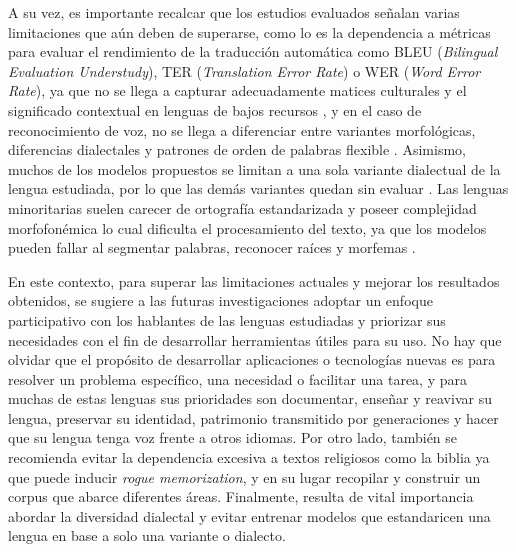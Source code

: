A su vez, es importante recalcar que los estudios evaluados señalan varias limitaciones que aún deben de superarse, como lo es la dependencia a métricas para evaluar el rendimiento de la traducción automática como BLEU (\textit{Bilingual Evaluation Understudy}), TER (\textit{Translation Error Rate}) o WER (\textit{Word Error Rate}), ya que no se llega a capturar adecuadamente matices culturales y el significado contextual en lenguas de bajos recursos \cite{Park2025}, y en el caso de reconocimiento de voz, no se llega a diferenciar entre variantes morfológicas, diferencias dialectales y patrones de orden de palabras flexible \cite{Akallouch2025}. 
Asimismo, muchos de los modelos propuestos se limitan a una sola  variante dialectual de la lengua estudiada, por lo que las demás variantes quedan sin evaluar \cite{Park2025, Santiago-Benito2025, Akallouch2025}. Las lenguas minoritarias suelen carecer de ortografía estandarizada y poseer complejidad morfofonémica lo cual dificulta el procesamiento del texto, ya que los modelos pueden fallar al segmentar palabras, reconocer raíces y morfemas \cite{Liu2022, Manimaran2024, Vallejo-Huanga2026, Akallouch2025}.

En este contexto, para superar las limitaciones actuales y mejorar los resultados obtenidos, se sugiere a las futuras investigaciones adoptar un enfoque participativo con los hablantes de las lenguas estudiadas y priorizar sus necesidades con el fin de desarrollar herramientas útiles para su uso. No hay que olvidar que el propósito de desarrollar aplicaciones o tecnologías nuevas es para resolver un problema específico, una necesidad o facilitar una tarea, y para muchas de estas lenguas sus prioridades son documentar, enseñar y reavivar su lengua, preservar su identidad, patrimonio transmitido por generaciones y hacer que su lengua tenga voz frente a otros idiomas. Por otro lado, también se recomienda evitar la dependencia excesiva a textos religiosos como la biblia ya que puede inducir \textit{rogue memorization}, y en su lugar recopilar y construir un corpus que abarce diferentes áreas. Finalmente, resulta de vital importancia abordar la diversidad dialectal y evitar entrenar modelos que estandaricen una lengua en base a solo una variante o dialecto.





